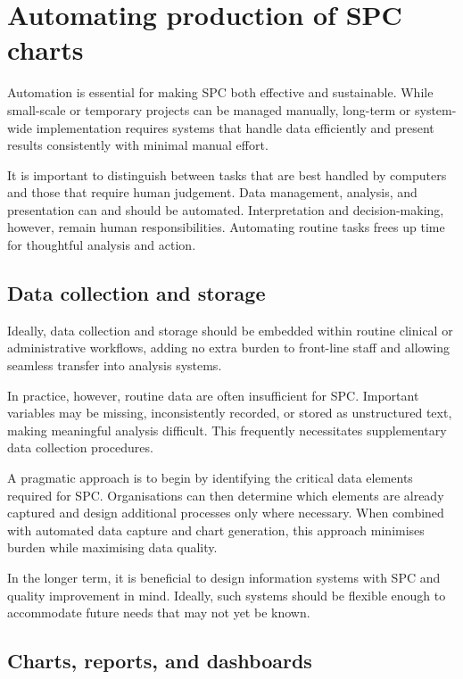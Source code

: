 \documentclass[
]{book}
\begin{document}
\section{Automating production of SPC
charts}\label{automating-production-of-spc-charts}

Automation is essential for making SPC both effective and sustainable.
While small-scale or temporary projects can be managed manually,
long-term or system-wide implementation requires systems that handle
data efficiently and present results consistently with minimal manual
effort.

It is important to distinguish between tasks that are best handled by
computers and those that require human judgement. Data management,
analysis, and presentation can and should be automated. Interpretation
and decision-making, however, remain human responsibilities. Automating
routine tasks frees up time for thoughtful analysis and action.

\subsection{Data collection and
storage}\label{data-collection-and-storage}

Ideally, data collection and storage should be embedded within routine
clinical or administrative workflows, adding no extra burden to
front-line staff and allowing seamless transfer into analysis systems.

In practice, however, routine data are often insufficient for SPC.
Important variables may be missing, inconsistently recorded, or stored
as unstructured text, making meaningful analysis difficult. This
frequently necessitates supplementary data collection procedures.

A pragmatic approach is to begin by identifying the critical data
elements required for SPC. Organisations can then determine which
elements are already captured and design additional processes only where
necessary. When combined with automated data capture and chart
generation, this approach minimises burden while maximising data
quality.

In the longer term, it is beneficial to design information systems with
SPC and quality improvement in mind. Ideally, such systems should be
flexible enough to accommodate future needs that may not yet be known.

\subsection{Charts, reports, and
dashboards}\label{charts-reports-and-dashboards}
\end{document}
